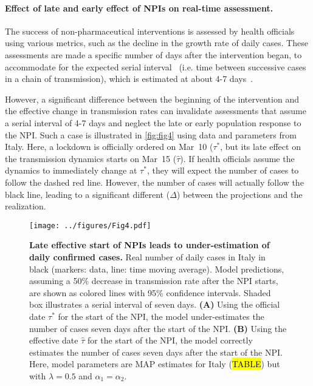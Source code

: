 \documentclass[12pt]{extarticle}
\begin{document}
\paragraph*{Effect of late and early effect of NPIs on real-time assessment.}

The success of non-pharmaceutical interventions is assessed by health officials using various metrics, such as the decline in the growth rate of daily cases. These assessments are made a specific number of days after the intervention began, to accommodate for the expected serial interval~\citep{Banholzer2020} (i.e. time between successive cases in a chain of transmission), which is estimated at about 4-7 days~\citep{Gatto2020}. %

However, a significant difference between the beginning of the intervention and the effective change in transmission rates can invalidate assessments that assume a serial interval of 4-7 days and neglect the late or early population response to the NPI.
Such a case is illustrated in \autoref{fig:fig4} using data and parameters from Italy.
Here, a lockdown is officially ordered on Mar~10 ($\tau^*$, but its late effect on the transmission dynamics starts on Mar~15 ($\hat{\tau}$). If health officials assume the dynamics to immediately change at $\tau^*$, they will expect the number of cases to follow the dashed red line. However, the number of cases will actually follow the black line, leading to a significant different ($\Delta$) between the projections and the realization.


\begin{figure}[h]
    \centering
	\texttt{[image: ../figures/Fig4.pdf]}
    \caption{
    \textbf{Late effective start of NPIs leads to under-estimation of daily confirmed cases.}
    Real number of daily cases in Italy in black (markers: data, line: time moving average). Model predictions, assuming a 50\% decrease in transmission rate after the NPI starts, are shown as colored lines with 95\% confidence intervals. 
    Shaded box illustrates a serial interval of seven days.
    \textbf{(A)} Using the official date $\tau^*$ for the start of the NPI,  the model under-estimates the number of cases seven days after the start of the NPI.
    \textbf{(B)} Using the effective date $\hat{\tau}$ for the start of the NPI,  the model correctly estimates the number of cases seven days after the start of the NPI.
    Here, model parameters are MAP estimates for Italy (\hl{TABLE}) but with $\lambda=0.5$ and $\alpha_1=\alpha_2$.
    } 
    \label{fig:fig4}
\end{figure}
\end{document}
